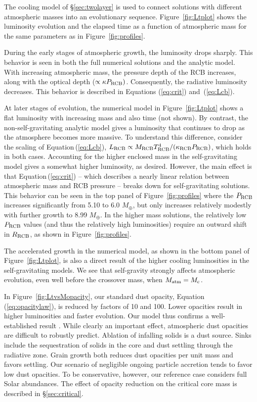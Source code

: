 \documentclass[apj, numberedappendix]{emulateapj}
\newcommand{\Eq}[1]{Equation\,(\ref{#1})}
\newcommand{\Eqs}[2]{Equations (\ref{#1}) and~(\ref{#2})}
\newcommand{\Fig}[1]{Figure~\ref{#1}}
\newcommand{\co}{_{\rm c}}
\newcommand{\cb}{_{\rm RCB}}
\begin{document}
The cooling model of \S\ref{sec:twolayer} is used to connect solutions with different atmospheric masses into an evolutionary sequence.  \Fig{fig:Ltplot} shows the luminosity evolution and the elapsed time as a function of atmospheric mass for the same parameters as in \Fig{fig:profiles}.

During the early stages of atmospheric growth, the luminosity drops sharply.  This behavior is seen in both the full numerical solutions and the analytic model.  With increasing atmospheric mass, the pressure depth of the RCB increases, along with the optical depth ($\propto \kappa P\cb)$.  Consequently, the radiative luminosity decreases.  This behavior is described in \Eqs{eq:crit}{eq:Lcb}.

At later stages of evolution, the numerical model in \Fig{fig:Ltplot} shows a flat luminosity with increasing mass and also time (not shown).  By contrast, the non-self-gravitating analytic model gives a luminosity that continues to drop as the atmosphere becomes more massive.  To understand this difference, consider the scaling of \Eq{eq:Lcb}, $L\cb \propto M\cb T\cb^4/ (\kappa\cb  P\cb)$, which holds in both cases.   Accounting for the higher enclosed mass in the self-gravitating model gives a somewhat higher luminosity, as desired.  However, the main effect is that \Eq{eq:crit} -- which describes a nearly linear relation between atmospheric mass and RCB pressure --  breaks down for self-gravitating solutions.  This behavior can be seen in the top panel of \Fig{fig:profiles} where the $P\cb$ increases significantly from 5.10 to 6.0 $M_\oplus$, but only increases relatively modestly with further growth to 8.99 $M_\oplus$.   In the higher mass solutions, the relatively low $P\cb$ values (and thus the relatively high luminosities) require an outward shift in $R\cb$, as shown in \Fig{fig:profiles}.

The accelerated growth in the numerical model, as shown in the bottom panel of \Fig{fig:Ltplot}, is also a direct result of the higher cooling luminosities in the self-gravitating models.  We see that self-gravity strongly affects atmospheric evolution, even well before the crossover mass, when $M_{\rm atm}=M\co$.

In \Fig{fig:LtvsMopacity}, our standard dust opacity, \Eq{eq:opacitylaw}, is reduced by factors of 10 and 100.  Lower opacities result in higher luminosities and faster evolution.  Our model thus confirms a well-established result \citep{HubBod05}.  While clearly an important effect, atmospheric dust opacities are difficult to robustly predict. Ablation of infalling solids is a dust source.  Sinks include the sequestration of solids in the core and dust settling through the radiative zone.  Grain growth both reduces dust opacities per unit mass and favors settling.  Our scenario of negligible ongoing particle accretion tends to favor low dust opacities.   To be conservative, however, our reference case considers full Solar abundances. The effect of opacity reduction on the critical core mass is described in \S\ref{sec:critical}. 
\end{document}
